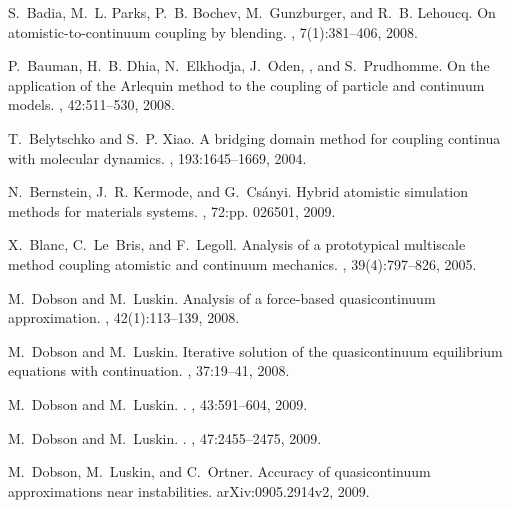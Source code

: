 \documentclass[12pt,reqno]{amsart}
\begin{document}
\begin{thebibliography}{10}

S.~Badia, M.~L. Parks, P.~B. Bochev, M.~Gunzburger, and R.~B. Lehoucq.
\newblock On atomistic-to-continuum coupling by blending.
, 7(1):381--406, 2008.

P.~Bauman, H.~B. Dhia, N.~Elkhodja, J.~Oden, , and S.~Prudhomme.
\newblock On the application of the {A}rlequin method to the coupling of
  particle and continuum models.
, 42:511--530, 2008.

T.~Belytschko and S.~P. Xiao.
\newblock A bridging domain method for coupling continua with molecular
  dynamics.
,
  193:1645--1669, 2004.

N.~Bernstein, J.~R. Kermode, and G.~Cs{\'{a}}nyi.
\newblock Hybrid atomistic simulation methods for materials systems.
, 72:pp. 026501, 2009.

X.~Blanc, C.~Le~Bris, and F.~Legoll.
\newblock Analysis of a prototypical multiscale method coupling atomistic and
  continuum mechanics.
, 39(4):797--826, 2005.

M.~Dobson and M.~Luskin.
\newblock Analysis of a force-based quasicontinuum approximation.
, 42(1):113--139, 2008.

M.~Dobson and M.~Luskin.
\newblock Iterative solution of the quasicontinuum equilibrium equations with
  continuation.
, 37:19--41, 2008.

M.~Dobson and M.~Luskin.
.
, 43:591--604,
  2009.

M.~Dobson and M.~Luskin.
.
, 47:2455--2475, 2009.

M.~Dobson, M.~Luskin, and C.~Ortner.
\newblock Accuracy of quasicontinuum approximations near instabilities.
\newblock arXiv:0905.2914v2, 2009.


\end{thebibliography}
\end{document}

